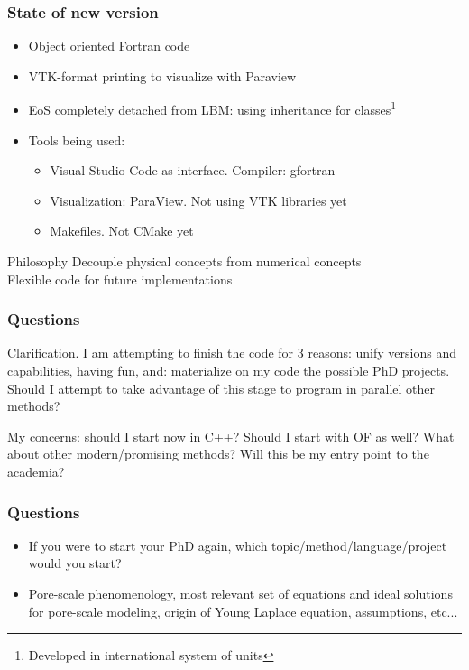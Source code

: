 \documentclass{beamer}
\begin{document}
	
		\begin{frame}
			\frametitle{State of new version}
			\begin{itemize}
				\item Object oriented Fortran code
				\item VTK-format printing to visualize with Paraview
				\item EoS completely detached from LBM: using inheritance for classes\footnote{Developed in international system of units}
				\item Tools being used:
				\begin{itemize}
					\item Visual Studio Code as interface. Compiler: gfortran
					\item Visualization: ParaView. Not using VTK libraries yet
					\item Makefiles. Not CMake yet
				\end{itemize}
			\end{itemize}
			\begin{alertblock}{Philosophy}
				Decouple physical concepts from numerical concepts\\
				Flexible code for future implementations
			\end{alertblock}
		\end{frame}
		
		\begin{frame}
			\frametitle{Questions}
			Clarification. I am attempting to finish the code for 3 reasons: unify versions and capabilities, having fun, and: materialize on my code the possible PhD projects. Should I attempt to take advantage of this stage to program in parallel other methods?
			
			My concerns: should I start now in C++? Should I start with OF as well? What about other modern/promising methods? Will this be my entry point to the academia?
		\end{frame}
		
		\begin{frame}
			\frametitle{Questions}
			\begin{itemize}
				\item If you were to start your PhD again, which topic/method/language/project would you start? 
				\item Pore-scale phenomenology, most relevant set of equations and ideal solutions for pore-scale modeling, origin of Young Laplace equation, assumptions, etc...
			\end{itemize}
		\end{frame}
		
\end{document}
